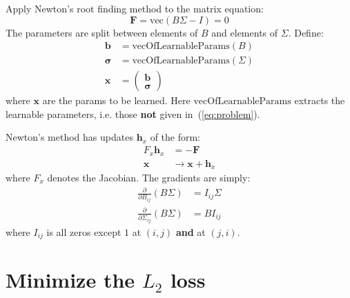\documentclass[11pt]{article}
\begin{document}
Apply Newton's root finding method to the matrix equation:
\begin{equation}
\boldsymbol{F} = \text{vec}(B\Sigma - I) = 0
\end{equation}
The parameters are split between elements of $B$ and elements of $\Sigma$. Define:
\begin{equation}
\begin{split}
\boldsymbol{b} &= \text{vecOfLearnableParams}(B) \\
\boldsymbol{\sigma} &= \text{vecOfLearnableParams}(\Sigma) \\
\boldsymbol{x} &= \begin{pmatrix}
	\boldsymbol{b} \\
	\boldsymbol{\sigma}
\end{pmatrix}
\end{split}
\end{equation}
where $\boldsymbol{x}$ are the params to be learned. Here $\text{vecOfLearnableParams}$ extracts the learnable parameters, i.e. those \textbf{not} given in~(\ref{eq:problem}).

Newton's method has updates $\boldsymbol{h}_x$ of the form:
\begin{equation}
\begin{split}
F_x \boldsymbol{h}_x &= - \boldsymbol{F} \\
\boldsymbol{x} &\rightarrow \boldsymbol{x} + \boldsymbol{h}_x
\end{split}
\end{equation}
where $F_x$ denotes the Jacobian. The gradients are simply:
\begin{equation}
\begin{split}
\frac{\partial}{\partial B_{ij}} (B\Sigma) &= I_{ij} \Sigma \\
\frac{\partial}{\partial \Sigma_{ij}} (B\Sigma) &= B I_{ij}
\end{split}
\end{equation}
where $I_{ij}$ is all zeros except $1$ at $(i,j)$ \textbf{and} at $(j,i)$.


\section{Minimize the $L_2$ loss}
\end{document}
